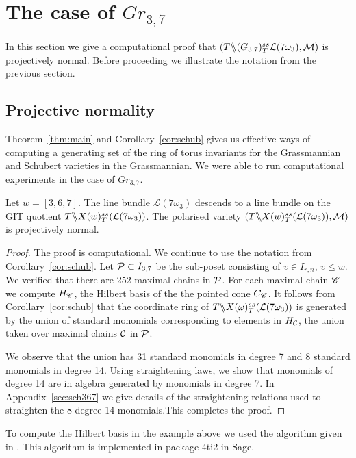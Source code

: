 \section{The case of $Gr_{3,7}$}
\label{sec:g37}
In this section we give a computational proof that $(T \backslash\mkern-6mu\backslash (G_{{3},{7}})^{ss}_T{\cal L}(7\omega_3),{\cal M})$ is projectively normal. Before proceeding we illustrate the notation from the previous section.


\subsection{Projective normality}
Theorem~\ref{thm:main} and Corollary~\ref{cor:schub} gives us effective ways of computing a generating set of the ring of torus invariants for the Grassmannian and Schubert varieties in the Grassmannian. We were able to run computational experiments in the case of $Gr_{3,7}$.

 \begin{theorem}
 \label{thm:w}
 Let  $w = [3,6,7].$  The line bundle \({\mathcal L}(7\omega_3)\) descends to a line bundle on the GIT quotient \(T \backslash\mkern-6mu\backslash X(w)^{ss}_T({\cal L}(7\omega_3))\). The polarised variety \((T \backslash\mkern-6mu\backslash X(w)^{ss}_T({\cal L}(7\omega_3)),{\cal M})\) is projectively normal.
\end{theorem}
\begin{proof}
The proof is computational. We continue to use the notation from Corollary~\ref{cor:schub}.   Let \({\cal P} \subset I_{3,7}\) be the sub-poset consisting of $v \in I_{r,n}$, $v \leq w$. We verified that there are 252 maximal chains in \({\cal P}\). For each maximal chain $\mathscr{C}$ we compute $H_{\mathscr{C}}$, the Hilbert basis of the the pointed cone \(C_{\mathscr{C}}\). It follows from Corollary~\ref{cor:schub} that the coordinate ring of \(T \backslash\mkern-6mu\backslash X(\omega)^{ss}_T({\cal L}(7\omega_3))\) is generated by the union of standard monomials corresponding to elements in $H_{\cal C}$, the union taken over maximal chains  ${\cal C}$ in ${\cal P}$.
    
We observe that the union has 31 standard monomials in degree 7 and 8 standard monomials in degree 14. Using straightening laws, we show that monomials of degree 14 are in algebra generated by monomials in degree 7.  In Appendix~\ref{sec:sch367} we give details of the straightening relations used to straighten the 8 degree 14 monomials.This completes the proof. 
\end{proof}

To compute the Hilbert basis in the example above we used the algorithm given in \cite{hemmecke2002computation}. This algorithm is implemented in package 4ti2 in Sage.

